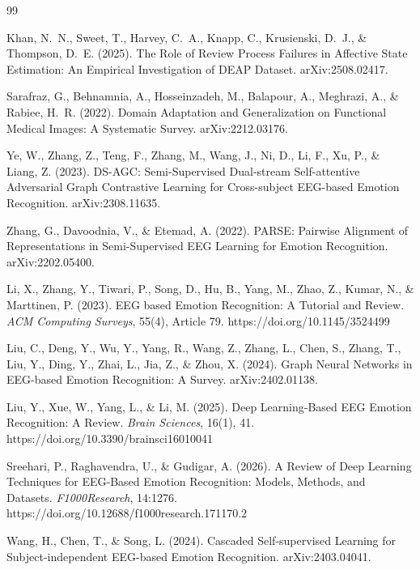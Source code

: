 \documentclass[11pt]{report}
\begin{document}
\begin{thebibliography}{99}

Khan, N.~N., Sweet, T., Harvey, C.~A., Knapp, C., Krusienski, D.~J., \&
Thompson, D.~E. (2025). The Role of Review Process Failures in Affective
State Estimation: An Empirical Investigation of DEAP Dataset.
arXiv:2508.02417.

Sarafraz, G., Behnamnia, A., Hosseinzadeh, M., Balapour, A., Meghrazi, A.,
\& Rabiee, H.~R. (2022). Domain Adaptation and Generalization on Functional
Medical Images: A Systematic Survey. arXiv:2212.03176.

Ye, W., Zhang, Z., Teng, F., Zhang, M., Wang, J., Ni, D., Li, F., Xu, P., \&
Liang, Z. (2023). DS-AGC: Semi-Supervised Dual-stream Self-attentive
Adversarial Graph Contrastive Learning for Cross-subject EEG-based Emotion
Recognition. arXiv:2308.11635.

Zhang, G., Davoodnia, V., \& Etemad, A. (2022). PARSE: Pairwise Alignment
of Representations in Semi-Supervised EEG Learning for Emotion Recognition.
arXiv:2202.05400.

Li, X., Zhang, Y., Tiwari, P., Song, D., Hu, B., Yang, M., Zhao, Z., Kumar,
N., \& Marttinen, P. (2023). EEG based Emotion Recognition: A Tutorial and
Review. \emph{ACM Computing Surveys}, 55(4), Article 79.
https://doi.org/10.1145/3524499

Liu, C., Deng, Y., Wu, Y., Yang, R., Wang, Z., Zhang, L., Chen, S., Zhang,
T., Liu, Y., Ding, Y., Zhai, L., Jia, Z., \& Zhou, X. (2024). Graph Neural
Networks in EEG-based Emotion Recognition: A Survey. arXiv:2402.01138.

Liu, Y., Xue, W., Yang, L., \& Li, M. (2025). Deep Learning-Based EEG
Emotion Recognition: A Review. \emph{Brain Sciences}, 16(1), 41.
https://doi.org/10.3390/brainsci16010041

Sreehari, P., Raghavendra, U., \& Gudigar, A. (2026). A Review of Deep
Learning Techniques for EEG-Based Emotion Recognition: Models, Methods, and
Datasets. \emph{F1000Research}, 14:1276.
https://doi.org/10.12688/f1000research.171170.2

Wang, H., Chen, T., \& Song, L. (2024). Cascaded Self-supervised Learning
for Subject-independent EEG-based Emotion Recognition. arXiv:2403.04041.


\end{thebibliography}
\end{document}
